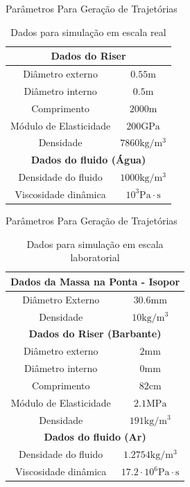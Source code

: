 \documentclass[10pt]{beamer}
\begin{document}
\begin{frame}[fragile]{Parâmetros Para Geração de Trajetórias}
\begin{table}[!ht]
\centering
\caption{Dados para simulação em escala real\label{escalaReal} \cite{redytton}}
	\begin{tabular}{|c|c|}
	\hline
		\multicolumn{2}{|c|}{\textbf{Dados do Riser}}\\ \hline
		Diâmetro externo & $0.55\mathrm{m}$\\ \hline
		Diâmetro interno & $0.5\mathrm{m}$ \\ \hline
		Comprimento & $2000\mathrm{m}$ \\ \hline
		Módulo de Elasticidade & $200 \mathrm{GPa}$\\ \hline
		Densidade &  $7860\mathrm{kg}/\mathrm{m}^3$\\ \hline
		\multicolumn{2}{|c|}{\textbf{Dados do fluido (Água)}}\\ \hline
		Densidade do fluido &  $1000\mathrm{kg}/\mathrm{m}^3$\\ \hline
		Viscosidade dinâmica & $10^3 \mathrm{Pa}\cdot \mathrm{s}$ \\ \hline
	\end{tabular}



\end{table}

\end{frame}

\begin{frame}[fragile]{Parâmetros Para Geração de Trajetórias}

\begin{table}[!ht]
	\caption{Dados para simulação em escala laboratorial\label{escalaLaboratorial}}
	\centering
	\begin{tabular}{|c|c|}
		\hline
			\multicolumn{2}{|c|}{\textbf{Dados da Massa na Ponta - Isopor}} \\ \hline
			Diâmetro Externo & $30.6\mathrm{mm}$\\ \hline
			Densidade & $10\mathrm{kg}/\mathrm{m}^3$ \\ \hline
			\multicolumn{2}{|c|}{\textbf{Dados do Riser (Barbante)}}\\ \hline
			Diâmetro externo & $2\mathrm{mm}$\\ \hline
			Diâmetro interno & $0\mathrm{mm}$ \\ \hline
			Comprimento & $82\mathrm{cm}$ \\ \hline
			Módulo de Elasticidade & $2.1 \mathrm{MPa}$\\ \hline
			Densidade &  $191\mathrm{kg}/\mathrm{m}^3$\\ \hline
			\multicolumn{2}{|c|}{\textbf{Dados do fluido (Ar)}}\\ \hline
			Densidade do fluido &  $1.2754\mathrm{kg}/\mathrm{m}^3$\\ \hline
			Viscosidade dinâmica & $17.2\cdot 10^6 \mathrm{Pa}\cdot \mathrm{s}$ \\ \hline
		\end{tabular}
\end{table}

\end{frame}
\end{document}
